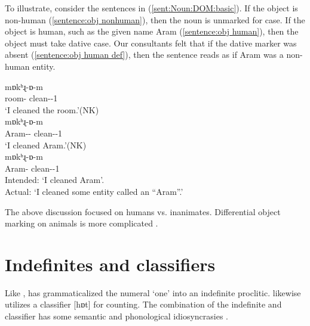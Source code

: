 To illustrate, consider the sentences in (\ref{sent:Noun:DOM:basic}). If the object is   non-human (\ref{sentence:obj nonhuman}), then the noun is unmarked for case.  If the object is   human, such as the given name Aram (\ref{sentence:obj human}), then the object must take dative case.  Our consultants felt that if the dative marker was absent (\ref{sentence:obj human def}), then the sentence reads as if Aram was a non-human entity.  

\begin{exe}
	\ex \label{sent:Noun:DOM:basic}
	\begin{xlist}
		\ex {} {mɒkʰɻ-ɒ-m}
		\\
		room-{} clean-{\pst}-1{\sg}
		\\
		\trans			`I cleaned the room.'\hfill (NK)\label{sentence:obj nonhuman}
		\\
		\ex {} {mɒkʰɻ-ɒ-m}
		\\
		Aram-{\dat}-{} clean-{\pst}-1{\sg}
		\\
		\trans	`I cleaned Aram.'\hfill (NK)\label{sentence:obj human}
		\\
		\ex {} {mɒkʰɻ-ɒ-m}
		\\
		Aram-{} clean-{\pst}-1{\sg}
		\\
		\trans	Intended: `I cleaned Aram'.
		\\ Actual: `I cleaned some entity called an ``Aram''.'\label{sentence:obj human def}
	\end{xlist}
	
\end{exe}

The above discussion focused on humans vs. inanimates. Differential object marking on animals is more complicated \citep[\S2.1.1.1]{DumTragut-2009-ArmenianReferenceGrammar}. 

\section{Indefinites and classifiers}\label{section:noun:indf}\largerpage
Like {\seaSEA}, {\iaIA} has grammaticalized the numeral `one' into an indefinite proclitic. {\iaIA} likewise utilizes a classifier [hɒt] for counting. The combination of the indefinite and classifier has some semantic and phonological idiosyncrasies \citep{Hodgson-2020-DiscourseConfigurationalityNounPhraseEasternArmenian,Sargsyan-2022-FormsIndefiniteArticleEasternArmenianPreModernEarlyColloquialEasternArmenianSources}.



